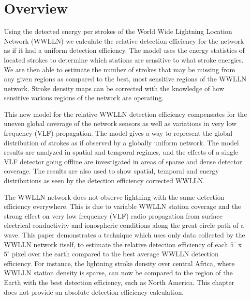 \section{Overview}

Using the detected energy per strokes of the World Wide Lightning Location Network (WWLLN) we calculate the relative detection efficiency for the network as if it had a uniform  detection efficiency.
The model uses the energy statistics of located strokes to determine which stations are sensitive to what stroke energies.
We are then able to estimate the number of strokes that may be missing from any given regions as compared to the best, most sensitive regions of the WWLLN network.
Stroke density maps can be corrected with the knowledge of how sensitive various regions of the network are operating.

This new model for the relative WWLLN detection efficiency compensates for the uneven global coverage of the network sensors as well as variations in very low frequency (VLF) propagation.
The model gives a way to represent the global distribution of strokes as if observed by a globally uniform network.
The model results are analyzed in spatial and temporal regimes, and the effects of a single VLF detector going offline are investigated in areas of sparse and dense detector coverage.
The results are also used to show spatial, temporal and energy distributions as seen by the detection efficiency corrected WWLLN.

The WWLLN network does not observe lightning with the same detection efficiency everywhere.
This is due to variable WWLLN station coverage and the strong effect on very low frequency (VLF) radio propagation from surface electrical conductivity and ionospheric conditions along the great circle path of a wave.
This paper demonstrates a technique which uses only data collected by the WWLLN network itself, to estimate the relative detection efficiency of each $5^\circ$ x $5^\circ$ pixel over the earth compared to the best average WWLLN detection efficiency.
For instance, the lightning stroke density over central Africa, where WWLLN station density is sparse, can now be compared to the region of the Earth with the best detection efficiency, such as North America.
This chapter does not provide an absolute detection efficiency calculation.

